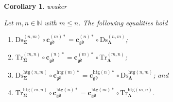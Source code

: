 \documentclass[a4paper, reqno]{amsbook}
\makeatletter
\newcommand{\sig}[1]{\mathbf{#1}}             %
\newcommand{\gd}{\mathfrak{gd}}              %
\newcommand{\htg}{\mathrm{htg}}                %
\newcommand{\Ds}{\mathrm{Ds}}
\newcommand{\Tr}{\mathrm{Tr}}
\theoremstyle{plain}
\newtheorem{corollary}[theorem]{Corollary}
\theoremstyle{definition}
\newcommand*{\CA@leanpending}{}
\newcommand*{\CA@leanrelation}{}
\newcommand*{\lean}[2]{%
  \ifcsname\string\color@lean@#1\endcsname\else
    \PackageError{main}{Unknown relation `#1' in \string\lean}{Use equivalent, weaker or stronger.}%
  \fi
  \gdef\CA@leanrelation{#1}%
  \gdef\CA@leanpending{#2}}
\makeatother
\begin{document}
\begin{corollary}\label{CChangeSigDsTr}\lean{weaker}{ChangeOfSignature.homogeneousDiscretizationFunctorChange,ChangeOfSignature.homogeneousTruncationFunctorChange,ChangeOfSignature.heterogeneousDiscretizationFunctorChange,ChangeOfSignature.heterogeneousTruncationFunctorChange}
Let $m,n\in\mathbb{N}$ with $m\leq n$.
The following equalities hold
\begin{enumerate}
	\item
	$\Ds^{(n,m)}_{\sig{\Sigma}}\circ\mathbf{c}^{(m)\ast}_{\gd}=\mathbf{c}^{(n)\ast}_{\gd}\circ\Ds^{(n,m)}_{\sig{\Lambda}}$;

	\item
	$\Tr^{(m,n)}_{\sig{\Sigma}}\circ\mathbf{c}^{(n)\ast}_{\gd}=\mathbf{c}^{(m)\ast}_{\gd}\circ\Tr^{(m,n)}_{\sig{\Lambda}}$;

	\item
	$\Ds^{\htg(n,m)}_{\sig{\Sigma}}\circ\mathbf{c}^{\htg(m)\ast}_{\gd}=\mathbf{c}^{\htg(n)\ast}_{\gd}\circ\Ds^{\htg(n,m)}_{\sig{\Lambda}}$; and

	\item
	$\Tr^{\htg(m,n)}_{\sig{\Sigma}}\circ\mathbf{c}^{\htg(n)\ast}_{\gd}=\mathbf{c}^{\htg(m)\ast}_{\gd}\circ\Tr^{\htg(m,n)}_{\sig{\Lambda}}$.
\end{enumerate}
\end{corollary}
\end{document}
